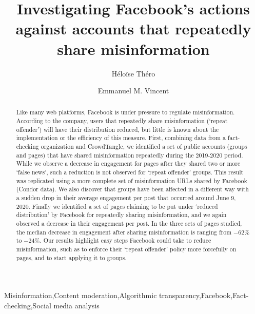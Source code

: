 \documentclass[review]{elsarticle}
\begin{document}
\begin{frontmatter}

\title{Investigating Facebook's actions against accounts that repeatedly share misinformation}

\author[mymainaddress]{Héloïse Théro}

\author[mymainaddress]{Emmanuel M. Vincent}

\address[mymainaddress]{médialab - Sciences Po, Paris, France}

\begin{abstract}

Like many web platforms, Facebook is under pressure to regulate misinformation.
According to the company, users that repeatedly share misinformation (`repeat offender') will have their distribution reduced, but little is known about the implementation or the efficiency of this measure.
First, combining data from a fact-checking organization and CrowdTangle, we identified a set of public accounts (groups and pages) that have shared misinformation repeatedly during the 2019-2020 period.
While we observe a decrease in engagement for pages after they shared two or more `false news', such a reduction is not observed for `repeat offender' groups.
This result was replicated using a more complete set of misinformation URLs shared by Facebook (Condor data).
We also discover that groups have been affected in a different way with a sudden drop in their average engagement per post that occurred around June 9, 2020.
Finally we identified a set of pages claiming to be put under `reduced distribution' by Facebook for repeatedly sharing misinformation, and we again observed a decrease in their engagement per post.
In the three sets of pages studied, the median decrease in engagement after sharing misinformation is ranging from $-62\%$ to $-24\%$.
Our results highlight easy steps Facebook could take to reduce misinformation, such as to enforce their `repeat offender' policy more forcefully on pages, and to start applying it to groups.

\end{abstract}

\begin{keyword}
Misinformation\sep Content moderation\sep Algorithmic transparency\sep Facebook\sep Fact-checking\sep Social media analysis
\end{keyword}

\end{frontmatter}
\end{document}
